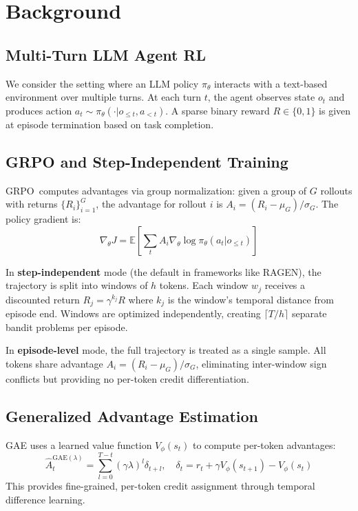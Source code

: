 \documentclass{article}
\begin{document}
\section{Background}

\subsection{Multi-Turn LLM Agent RL}

We consider the setting where an LLM policy $\pi_\theta$ interacts with a text-based environment over multiple turns. At each turn $t$, the agent observes state $o_t$ and produces action $a_t \sim \pi_\theta(\cdot | o_{\leq t}, a_{<t})$. A sparse binary reward $R \in \{0, 1\}$ is given at episode termination based on task completion.

\subsection{GRPO and Step-Independent Training}

GRPO~computes advantages via group normalization: given a group of $G$ rollouts with returns $\{R_i\}_{i=1}^G$, the advantage for rollout $i$ is $A_i = (R_i - \mu_G) / \sigma_G$. The policy gradient is:
\begin{equation}
\nabla_\theta J = \mathbb{E}\left[\sum_{t} A_i \nabla_\theta \log \pi_\theta(a_t | o_{\leq t})\right]
\end{equation}

In \textbf{step-independent} mode (the default in frameworks like RAGEN), the trajectory is split into windows of $h$ tokens. Each window $w_j$ receives a discounted return $R_j = \gamma^{k_j} R$ where $k_j$ is the window's temporal distance from episode end. Windows are optimized independently, creating $\lceil T/h \rceil$ separate bandit problems per episode.

In \textbf{episode-level} mode, the full trajectory is treated as a single sample. All tokens share advantage $A_i = (R_i - \mu_G)/\sigma_G$, eliminating inter-window sign conflicts but providing no per-token credit differentiation.

\subsection{Generalized Advantage Estimation}

GAE uses a learned value function $V_\phi(s_t)$ to compute per-token advantages:
\begin{equation}
\hat{A}_t^{\text{GAE}(\lambda)} = \sum_{l=0}^{T-t} (\gamma\lambda)^l \delta_{t+l}, \quad \delta_t = r_t + \gamma V_\phi(s_{t+1}) - V_\phi(s_t)
\end{equation}
This provides fine-grained, per-token credit assignment through temporal difference learning.
\end{document}
